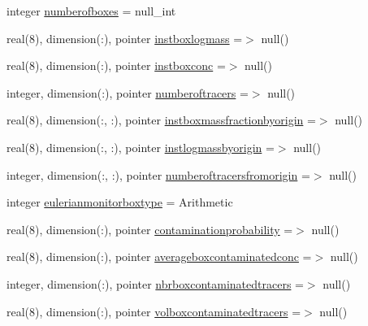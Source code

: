 \begin{DoxyCompactItemize}
\item 
integer \mbox{\hyperlink{structmodulelagrangianglobal_1_1t__monitorization_ad8e52744ddbaa8d3c5dd5298e14be4fe}{numberofboxes}} = null\+\_\+int
\item 
real(8), dimension(\+:), pointer \mbox{\hyperlink{structmodulelagrangianglobal_1_1t__monitorization_a086b250c83f19fa443ce5e80f72193c0}{instboxlogmass}} =$>$ null()
\item 
real(8), dimension(\+:), pointer \mbox{\hyperlink{structmodulelagrangianglobal_1_1t__monitorization_a3d3a8e9ded234f5b2da51af1e72d2315}{instboxconc}} =$>$ null()
\item 
integer, dimension(\+:), pointer \mbox{\hyperlink{structmodulelagrangianglobal_1_1t__monitorization_a4ab41eb62e4dca86c6e752065caa60c7}{numberoftracers}} =$>$ null()
\item 
real(8), dimension(\+:, \+:), pointer \mbox{\hyperlink{structmodulelagrangianglobal_1_1t__monitorization_a69477588299b24049e3b962ec5a7a442}{instboxmassfractionbyorigin}} =$>$ null()
\item 
real(8), dimension(\+:, \+:), pointer \mbox{\hyperlink{structmodulelagrangianglobal_1_1t__monitorization_a178edbb0a50ce5a921369eff4469ee61}{instlogmassbyorigin}} =$>$ null()
\item 
integer, dimension(\+:, \+:), pointer \mbox{\hyperlink{structmodulelagrangianglobal_1_1t__monitorization_a775e37c237c89c33bf098414fa285c68}{numberoftracersfromorigin}} =$>$ null()
\item 
integer \mbox{\hyperlink{structmodulelagrangianglobal_1_1t__monitorization_ac7de77bca0d41e5b7a50b2b5e23f290a}{eulerianmonitorboxtype}} = Arithmetic
\item 
real(8), dimension(\+:), pointer \mbox{\hyperlink{structmodulelagrangianglobal_1_1t__monitorization_ab2ac16ac86f43b5171394fa45cebeabb}{contaminationprobability}} =$>$ null()
\item 
real(8), dimension(\+:), pointer \mbox{\hyperlink{structmodulelagrangianglobal_1_1t__monitorization_a1da499c7a22c1ba60a9554d83d262ae3}{averageboxcontaminatedconc}} =$>$ null()
\item 
integer, dimension(\+:), pointer \mbox{\hyperlink{structmodulelagrangianglobal_1_1t__monitorization_af7ea4ceddb1db48109cfa51f636a43be}{nbrboxcontaminatedtracers}} =$>$ null()
\item 
real(8), dimension(\+:), pointer \mbox{\hyperlink{structmodulelagrangianglobal_1_1t__monitorization_addfdbdbea01542920ceb4def2e9fe9b1}{volboxcontaminatedtracers}} =$>$ null()
\end{DoxyCompactItemize}



